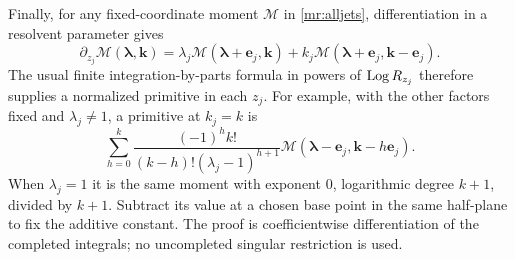Finally, for any fixed-coordinate moment $\mathcal M$ in
\eqref{mr:alljets}, differentiation in a resolvent parameter gives
\[
 \partial_{z_j}\mathcal M(\boldsymbol\lambda,\mathbf k)
 =\lambda_j\mathcal M(\boldsymbol\lambda+\mathbf e_j,\mathbf k)
   +k_j\mathcal M(\boldsymbol\lambda+\mathbf e_j,\mathbf k-\mathbf e_j).
\]
The usual finite integration-by-parts formula in powers of $\operatorname{Log} R_{z_j}$
therefore supplies a normalized primitive in each $z_j$. For example,
with the other factors fixed and $\lambda_j\ne1$, a primitive at
$k_j=k$ is
\[
 \sum_{h=0}^k\frac{(-1)^hk!}{(k-h)!(\lambda_j-1)^{h+1}}
      \mathcal M(\boldsymbol\lambda-\mathbf e_j,
                         \mathbf k-h\mathbf e_j).
\]
When $\lambda_j=1$ it is the same moment with exponent $0$, logarithmic
degree $k+1$, divided by $k+1$. Subtract its value at a chosen base point
in the same half-plane to fix the additive constant. The proof is
coefficientwise differentiation of the completed integrals; no
uncompleted singular restriction is used.
